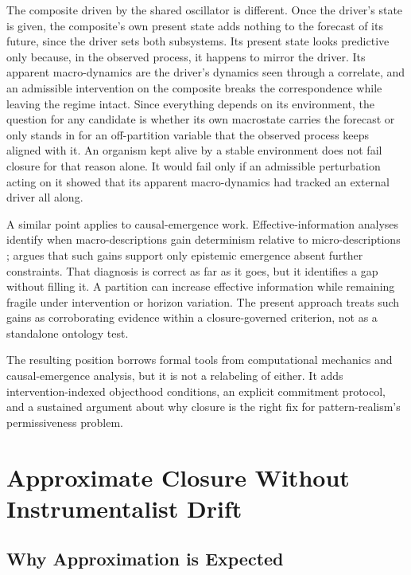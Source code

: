 The composite driven by the shared oscillator is different. Once the
driver's state is given, the composite's own present state adds nothing
to the forecast of its future, since the driver sets both subsystems.
Its present state looks predictive only because, in the observed
process, it happens to mirror the driver. Its apparent macro-dynamics
are the driver's dynamics seen through a correlate, and an admissible
intervention on the composite breaks the correspondence while leaving
the regime intact. Since everything depends on its environment, the
question for any candidate is whether its own macrostate carries the
forecast or only stands in for an off-partition variable that the
observed process keeps aligned with it. An organism
kept alive by a stable environment does not fail closure for that
reason alone. It would fail only if an admissible perturbation acting
on it showed that its apparent macro-dynamics had tracked an external
driver all along.

A similar point applies to causal-emergence work. Effective-information
analyses identify when macro-descriptions gain determinism relative to
micro-descriptions \citep{hoel2013}; \citet{dewhurst2021} argues that
such gains support only epistemic emergence absent further constraints.
That diagnosis is correct as far as it goes, but it identifies a gap
without filling it. A partition can increase effective information while remaining
fragile under intervention or horizon variation. The present approach
treats such gains as corroborating evidence within a closure-governed
criterion, not as a standalone ontology test.

The resulting position borrows formal tools from computational mechanics
and causal-emergence analysis, but it is not a relabeling of either. It
adds intervention-indexed objecthood conditions, an explicit commitment
protocol, and a sustained argument about why closure is the right fix
for pattern-realism's permissiveness problem.

\section{Approximate Closure Without Instrumentalist
  Drift}\label{approximate-closure-without-instrumentalist-drift}

\subsection{Why Approximation is
	Expected}\label{why-approximation-is-expected}

